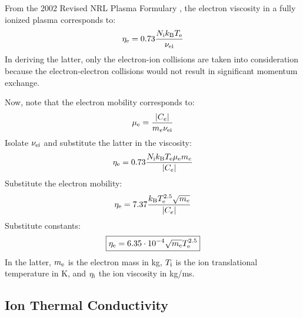 \documentclass{warpdoc}
\newcommand\frameeqn[1]{\fbox{$\displaystyle #1$}}
\begin{document}
From the 2002 Revised NRL Plasma Formulary \cite{nrl:2002:huba}, the electron viscosity in a fully ionized plasma corresponds to:
%
\begin{equation}
\eta_{\rm e}= 0.73    \frac{N_{\rm i} k_{\rm B} T_{\rm e} }{\nu_{\rm ei}}
\end{equation}
%
In deriving the latter, only the electron-ion collisions are taken into consideration because the electron-electron collisions would not result in significant momentum exchange.

Now, note that the electron mobility corresponds to:
%
\begin{equation}
 \mu_{\rm e} = \frac{|C_e|}{m_e \nu_{\rm ei}}
\end{equation}
%
Isolate $\nu_{\rm ei}$ and substitute the latter in the viscosity:
%
\begin{equation}
\eta_{\rm e}= 0.73    \frac{N_{\rm i} k_{\rm B} T_{\rm e}\mu_{\rm e} m_e }{|C_e|}
\end{equation}
%
Substitute the electron mobility:
%
\begin{equation}
\eta_{\rm e}= 7.37    \frac{ k_{\rm B} T_{\rm e}^{2.5}  \sqrt{m_e} }{|C_e|}
\end{equation}
%
Substitute constants:
%
\begin{equation}
\frameeqn{
\eta_{\rm e}=   6.35 \cdot 10^{-4}  \sqrt{m_{\rm e}}   T_{\rm e}^{2.5}  
}
\end{equation}
%
In the latter, $m_{\rm e}$ is the electron mass in kg, $T_{\rm i}$ is the ion translational temperature in K, and $\eta_{\rm i}$ the ion viscosity in kg/ms. 


\subsection{Ion Thermal Conductivity}
\end{document}
